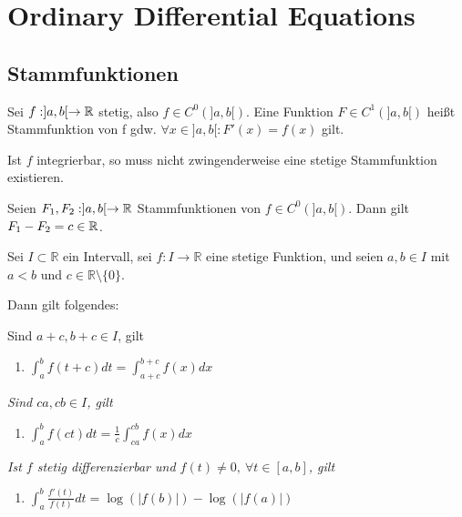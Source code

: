 \chapter{Ordinary Differential Equations}
\section{Stammfunktionen}
\begin{definition}

Sei $f:]a,b[\rightarrow\mathbb{R}$ stetig, also $f\in C^0(]a,b[)$.
Eine Funktion $F\in C^1(]a,b[)$ heißt Stammfunktion von f gdw. $\forall x\in ]a,b[: F'(x)=f(x)$ gilt.
\end{definition}

\begin{remark}
Ist $f$ integrierbar, so muss nicht zwingenderweise eine stetige Stammfunktion existieren.
\end{remark}

\begin{theorem}[Konstante]
Seien $F_1, F_2: ]a,b[\rightarrow \mathbb{R}$ Stammfunktionen von $f\in C^0(]a,b[)$. Dann gilt $F_1-F_2 = c\in\mathbb{R}$.
\end{theorem}
\begin{corollary}

Sei $I\subset \mathbb{R}$ ein Intervall, sei $f:I\rightarrow \mathbb{R}$ eine stetige Funktion, und seien $a,b \in I$ mit $a<b$ und $c\in \mathbb{R}\setminus\{0\}$.

Dann gilt folgendes:

Sind $a+c,b+c \in I$, gilt
	\begin{enumerate}
		\item $\int_{a}^{b}f(t+c)dt = \int_{a+c}^{b+c}f(x)dx$
	\end{enumerate}
	
	\textit{Sind $ca,cb \in I$, gilt}
	\begin{enumerate}[resume]
		\item $\int_{a}^{b}f(ct)dt = \frac{1}{c}\int_{ca}^{cb}f(x)dx$
	\end{enumerate}	

	\textit{Ist $f$ stetig differenzierbar und $f(t) \neq 0,\ \forall t \in [a,b]$, gilt}
	\begin{enumerate}[resume]
	\item $\int_{a}^{b}\frac{f'(t)}{f(t)}dt = \log(|f(b)|)- \log(|f(a)|)$
	\end{enumerate}	
\end{corollary}

